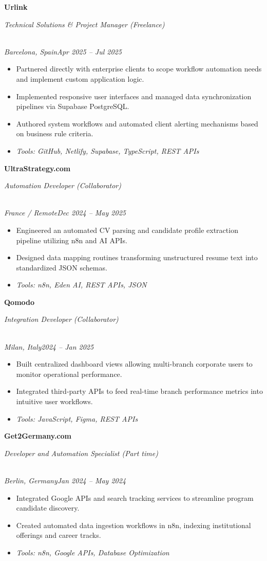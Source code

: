 \documentclass[a4paper,10pt]{article}
\newcommand{\role}[4]{\vspace{3pt}\noindent\hspace{0.6em}\parbox[t]{0.38\textwidth}{\raggedright\textbf{#1}}\hfill\parbox[t]{0.58\textwidth}{\raggedleft\textit{#2}}\\{\textit{#3}\hfill\textit{#4}}\vspace{1pt}}
\begin{document}
\role{Urlink}{Technical Solutions \& Project Manager (Freelance)}{Barcelona, Spain}{Apr 2025 -- Jul 2025}
\begin{itemize}
\item Partnered directly with enterprise clients to scope workflow automation needs and implement custom application logic.
\item Implemented responsive user interfaces and managed data synchronization pipelines via Supabase PostgreSQL.
\item Authored system workflows and automated client alerting mechanisms based on business rule criteria.
\item \textit{Tools: GitHub, Netlify, Supabase, TypeScript, REST APIs}
\end{itemize}

\role{UltraStrategy.com}{Automation Developer (Collaborator)}{France / Remote}{Dec 2024 -- May 2025}
\begin{itemize}
\item Engineered an automated CV parsing and candidate profile extraction pipeline utilizing n8n and AI APIs.
\item Designed data mapping routines transforming unstructured resume text into standardized JSON schemas.
\item \textit{Tools: n8n, Eden AI, REST APIs, JSON}
\end{itemize}

\role{Qomodo}{Integration Developer (Collaborator)}{Milan, Italy}{2024 -- Jan 2025}
\begin{itemize}
\item Built centralized dashboard views allowing multi-branch corporate users to monitor operational performance.
\item Integrated third-party APIs to feed real-time branch performance metrics into intuitive user workflows.
\item \textit{Tools: JavaScript, Figma, REST APIs}
\end{itemize}

\role{Get2Germany.com}{Developer and Automation Specialist (Part time)}{Berlin, Germany}{Jan 2024 -- May 2024}
\begin{itemize}
\item Integrated Google APIs and search tracking services to streamline program candidate discovery.
\item Created automated data ingestion workflows in n8n, indexing institutional offerings and career tracks.
\item \textit{Tools: n8n, Google APIs, Database Optimization}
\end{itemize}
\end{document}
